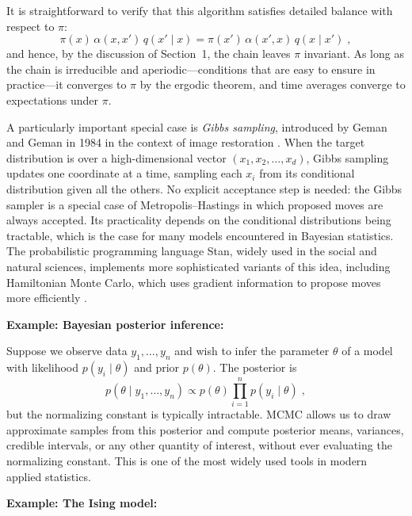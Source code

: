 \medskip

It is straightforward to verify that this algorithm satisfies detailed balance with respect to $\pi$:
\begin{equation}
    \pi(x)\, \alpha(x, x')\, q(x' \mid x) = \pi(x')\, \alpha(x', x)\, q(x \mid x') \; ,
\end{equation}
and hence, by the discussion of Section~1, the chain leaves $\pi$ invariant. As long as the chain is irreducible and aperiodic---conditions that are easy to ensure in practice---it converges to $\pi$ by the ergodic theorem, and time averages converge to expectations under $\pi$.

\medskip

A particularly important special case is \textit{Gibbs sampling}, introduced by Geman and Geman in 1984 in the context of image restoration \cite{geman_1984_stochastic}. When the target distribution is over a high-dimensional vector $(x_1, x_2, \dots, x_d)$, Gibbs sampling updates one coordinate at a time, sampling each $x_i$ from its conditional distribution given all the others. No explicit acceptance step is needed: the Gibbs sampler is a special case of Metropolis--Hastings in which proposed moves are always accepted. Its practicality depends on the conditional distributions being tractable, which is the case for many models encountered in Bayesian statistics. The probabilistic programming language Stan, widely used in the social and natural sciences, implements more sophisticated variants of this idea, including Hamiltonian Monte Carlo, which uses gradient information to propose moves more efficiently \cite{carpenter_2017_stan}.

\medskip

\textbf{Example: Bayesian posterior inference:}

\medskip

Suppose we observe data $y_1, \dots, y_n$ and wish to infer the parameter $\theta$ of a model with likelihood $p(y_i \mid \theta)$ and prior $p(\theta)$. The posterior is
\[
    p(\theta \mid y_1, \dots, y_n) \propto p(\theta) \prod_{i=1}^n p(y_i \mid \theta) \; ,
\]
but the normalizing constant is typically intractable. MCMC allows us to draw approximate samples from this posterior and compute posterior means, variances, credible intervals, or any other quantity of interest, without ever evaluating the normalizing constant. This is one of the most widely used tools in modern applied statistics.

\medskip

\textbf{Example: The Ising model:}

